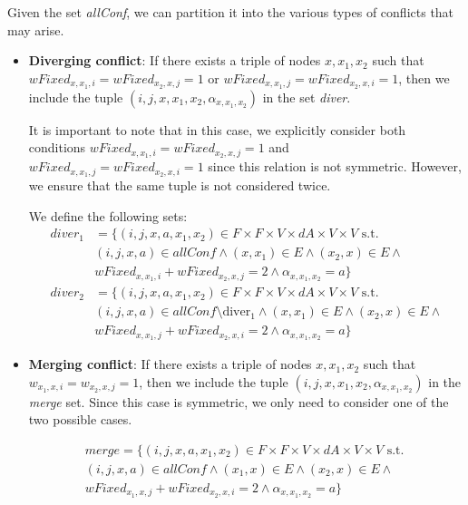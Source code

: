 \documentclass[../thesis.tex]{subfiles}
\begin{document}
Given the set \textit{allConf}, we can partition it into the various types of conflicts that may arise.

\begin{itemize}
    \item \textbf{Diverging conflict}: If there exists a triple of nodes $x, x_1, x_2$ such that $wFixed_{x,x_1,i} = wFixed_{x_2,x,j} = 1$ or $wFixed_{x,x_1,j} = wFixed_{x_2,x,i} = 1$, then we include the tuple $(i,j,x,x_1,x_2, \alpha_{x,x_1,x_2})$ in the set \textit{diver}.
    
    It is important to note that in this case, we explicitly consider both conditions $wFixed_{x,x_1,i} = wFixed_{x_2,x,j} = 1$ and $wFixed_{x,x_1,j} = wFixed_{x_2,x,i} = 1$ since this relation is not symmetric. However, we ensure that the same tuple is not considered twice.
    
    We define the following sets:
    \begin{align}
        diver_1 &= \{(i, j, x, a, x_1, x_2) \in F \times F \times V \times dA \times V \times V \text{ s.t. } \nonumber\\ 
        & (i,j,x,a)\in allConf \land (x,x_1) \in E \land (x_2,x) \in E \land \nonumber\\ 
        & wFixed_{x,x_1,i} + wFixed_{x_2,x,j} = 2 \land \alpha_{x,x_1,x_2} = a \}\\
        diver_2 &= \{(i, j, x, a, x_1, x_2) \in F \times F \times V \times dA \times V \times V \text{ s.t. } \nonumber\\ 
        & (i,j,x,a)\in allConf \setminus \text{diver}_1 \land (x,x_1) \in E \land (x_2,x) \in E \land \nonumber\\ 
        & wFixed_{x,x_1,j} + wFixed_{x_2,x,i} = 2 \land \alpha_{x,x_1,x_2} = a \}
    \end{align}
    
    \item \textbf{Merging conflict}: If there exists a triple of nodes $x, x_1, x_2$ such that $w_{x_1,x,i} = w_{x_2,x,j} = 1$, then we include the tuple $(i,j,x,x_1,x_2, \alpha_{x,x_1,x_2})$ in the \textit{merge} set.
    Since this case is symmetric, we only need to consider one of the two possible cases.

    \begin{align}
    merge = \{(i, j, x, a, x_1, x_2) \in F \times F \times V \times dA \times V \times V \text{ s.t. } \nonumber\\
    (i,j,x,a)\in allConf \land (x_1,x) \in E \land (x_2,x) \in E \land \nonumber\\
    wFixed_{x_1,x,j} + wFixed_{x_2,x,i} = 2 \land \alpha_{x,x_1,x_2} = a \}
    \end{align}


\end{itemize}
\end{document}

